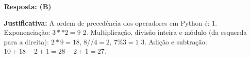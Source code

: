 \ifmostrarGabarito
\textbf{Resposta: (B)}

\textbf{Justificativa:}
A ordem de precedência dos operadores em Python é:
1. Exponenciação: $3 ** 2 = 9$
2. Multiplicação, divisão inteira e módulo (da esquerda para a direita):
   $2 * 9 = 18$, $8 // 4 = 2$, $7 \% 3 = 1$
3. Adição e subtração:
   $10 + 18 - 2 + 1 = 28 - 2 + 1 = 27$.

\fi
